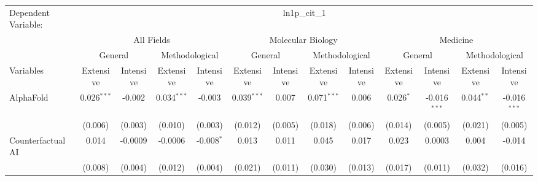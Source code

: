 \begingroup
\centering
\begin{tabular}{lcccccccccccc}
   \tabularnewline \midrule \midrule
   Dependent Variable: & \multicolumn{12}{c}{ln1p\_cit\_1}\\
 & \multicolumn{4}{c}{All Fields} & \multicolumn{4}{c}{Molecular Biology} & \multicolumn{4}{c}{Medicine} \\
\cmidrule(lr){2-5} \cmidrule(lr){6-9} \cmidrule(lr){10-13}
 & \multicolumn{2}{c}{General} & \multicolumn{2}{c}{Methodological} & \multicolumn{2}{c}{General} & \multicolumn{2}{c}{Methodological} & \multicolumn{2}{c}{General} & \multicolumn{2}{c}{Methodological} \\
\cmidrule(lr){2-3} \cmidrule(lr){4-5} \cmidrule(lr){6-7} \cmidrule(lr){8-9} \cmidrule(lr){10-11} \cmidrule(lr){12-13}
Variables & \multicolumn{1}{c}{Extensive} & \multicolumn{1}{c}{Intensive} & \multicolumn{1}{c}{Extensive} & \multicolumn{1}{c}{Intensive} & \multicolumn{1}{c}{Extensive} & \multicolumn{1}{c}{Intensive} & \multicolumn{1}{c}{Extensive} & \multicolumn{1}{c}{Intensive} & \multicolumn{1}{c}{Extensive} & \multicolumn{1}{c}{Intensive} & \multicolumn{1}{c}{Extensive} & \multicolumn{1}{c}{Intensive} \\
\cmidrule(lr){1-1}\cmidrule(lr){2-2} \cmidrule(lr){3-3} \cmidrule(lr){4-4} \cmidrule(lr){5-5} \cmidrule(lr){6-6} \cmidrule(lr){7-7} \cmidrule(lr){8-8} \cmidrule(lr){9-9} \cmidrule(lr){10-10} \cmidrule(lr){11-11} \cmidrule(lr){12-12} \cmidrule(lr){13-13}
   AlphaFold                                & 0.026$^{***}$  & -0.002       & 0.034$^{***}$  & -0.003       & 0.039$^{***}$ & 0.007          & 0.071$^{***}$  & 0.006         & 0.026$^{*}$    & -0.016$^{***}$ & 0.044$^{**}$   & -0.016$^{***}$\\   
                                            & (0.006)        & (0.003)      & (0.010)        & (0.003)      & (0.012)       & (0.005)        & (0.018)        & (0.006)       & (0.014)        & (0.005)        & (0.021)        & (0.005)\\   
   Counterfactual AI                        & 0.014          & -0.0009      & -0.0006        & -0.008$^{*}$ & 0.013         & 0.011          & 0.045          & 0.017         & 0.023          & 0.0003         & 0.004          & -0.014\\   
                                            & (0.008)        & (0.004)      & (0.012)        & (0.004)      & (0.021)       & (0.011)        & (0.030)        & (0.013)       & (0.017)        & (0.011)        & (0.032)        & (0.016)\\   

\end{tabular}
